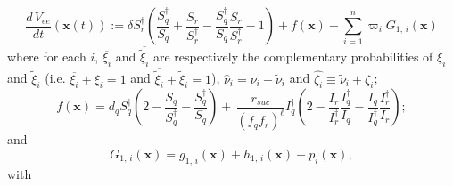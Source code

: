 \documentclass[a4paper]{article}
\newcommand{\dsum}{\displaystyle\sum}
\begin{document}
\begin{equation}\label{eq:eqliapeeder2rd1}
\frac{d\,V_{ee}}{dt}(\mathbf x(t)) :=    \delta S^\dagger _r  \left( \frac{S^\dagger _q}{S_q}+\frac{S_r}{S_r^\dagger }-\frac{S^\dagger _q}{S_q}\frac{S_r}{S_r^\dagger }-1\right) + f(\mathbf x)+{\dsum_{i=1}^n}\varpi_i G_{1,\,i}(\mathbf x) 
\end{equation}
%
where 
for each $i$, $\overline{\xi_i}$ and  $\overline{\widetilde\xi_i}$ are respectively the complementary probabilities of $\xi_i$ and $\widetilde\xi_i$ (i.e. $\overline{\xi_i}+\xi_i=1$ and $\overline{\widetilde\xi_i}+\widetilde\xi_i=1$), $ \hat \nu_i = \nu_i - \widetilde \nu_i$ and $\widehat{\zeta_i}\equiv\widetilde\nu_i+\zeta_i$;
\begin{equation*}
f(\mathbf x) = d_q S^\dagger _q\left(2-\frac{S_q}{S^\dagger _q}-\frac{S^\dagger _q}{S_q}\right)   +\, \frac{r_{suc}}{(f_qf_r)^{\ell}}I_q^\dagger  \left(2 - \frac{I_r}{I_r^\dagger }\frac{I_q^\dagger }{I_q}- \frac{I_q}{I_q^\dagger }\frac{I^\dagger _r}{I_r}\right);
\end{equation*}
and
\begin{equation}\label{eq:G1exp1}
G_{1,\,i}(\mathbf x) = g_{1,\,i}(\mathbf x)+h_{1,\,i}(\mathbf x)+p_{i}(\mathbf x),
\end{equation}
with
\end{document}
